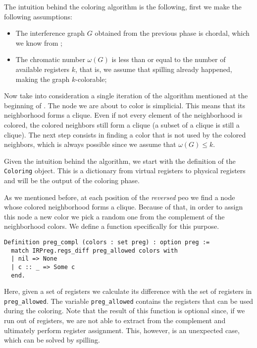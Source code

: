 The intuition behind the coloring algorithm is the following, first we make the following assumptions:

\begin{itemize}
  \item The interference graph $G$ obtained from the previous phase is chordal, which we know from ;
  \item The chromatic number $\omega(G)$ is less than or equal to the number of available registers $k$, that is, we assume that spilling already happened, making the graph $k$-colorable;
\end{itemize}

Now take into consideration a single iteration of the algorithm mentioned at the beginning of . The node we are about to color is simplicial. This means that its neighborhood forms a clique. Even if not every element of the neighborhood is colored, the colored neighbors still form a clique (a subset of a clique is still a clique). The next step consists in finding a color that is not used by the colored neighbors, which is always possible since we assume that $\omega(G) \leq k$.

Given the intuition behind the algorithm, we start with the definition of the \texttt{Coloring} object. This is a dictionary from virtual registers to physical registers and will be the output of the coloring phase.

As we mentioned before, at each position of the \textit{reversed} \gls{peo} we find a node whose colored neighborhood forms a clique. Because of that, in order to assign this node a new color we pick a random one from the complement of the neighborhood colors. We define a function specifically for this purpose.

\begin{lstlisting}[style=Rocq]
Definition preg_compl (colors : set preg) : option preg :=
  match IRPreg.regs_diff preg_allowed colors with
  | nil => None
  | c :: _ => Some c
  end.
\end{lstlisting}

Here, given a set of registers we calculate its difference with the set of registers in \texttt{preg\_allowed}. The variable \texttt{preg\_allowed} contains the registers that can be used during the coloring. Note that the result of this function is optional since, if we run out of registers, we are not able to extract from the complement and ultimately perform register assignment. This, however, is an unexpected case, which can be solved by spilling.

